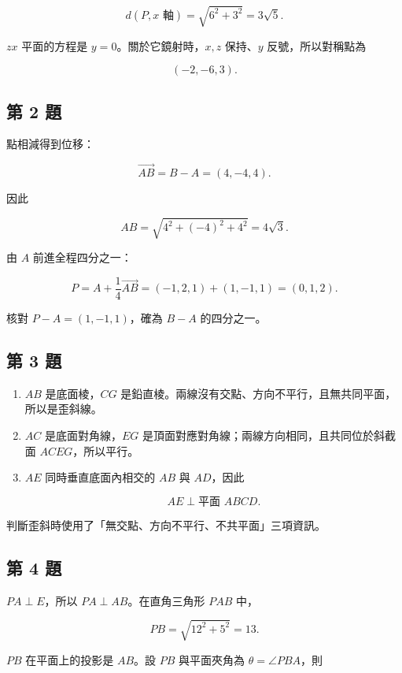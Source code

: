 \documentclass[11pt,a4paper]{article}
\begin{document}
\[
d(P,x\text{ 軸})
=\sqrt{6^2+3^2}
=3\sqrt5.
\]

\(zx\) 平面的方程是 \(y=0\)。關於它鏡射時，\(x,z\) 保持、\(y\) 反號，所以對稱點為

\[
\boxed{(-2,-6,3)}.
\]

\subsection{第 2 題}\label{ux7b2c-2-ux984c}

點相減得到位移：

\[
\overrightarrow{AB}=B-A=(4,-4,4).
\]

因此

\[
AB=\sqrt{4^2+(-4)^2+4^2}=4\sqrt3.
\]

由 \(A\) 前進全程四分之一：

\[
P=A+\frac14\overrightarrow{AB}
=(-1,2,1)+(1,-1,1)
=\boxed{(0,1,2)}.
\]

核對 \(P-A=(1,-1,1)\)，確為 \(B-A\) 的四分之一。

\subsection{第 3 題}\label{ux7b2c-3-ux984c}

\begin{enumerate}
\def\labelenumi{\arabic{enumi}.}
\item
  \(AB\) 是底面棱，\(CG\) 是鉛直棱。兩線沒有交點、方向不平行，且無共同平面，所以是歪斜線。
\item
  \(AC\) 是底面對角線，\(EG\) 是頂面對應對角線；兩線方向相同，且共同位於斜截面 \(ACEG\)，所以平行。
\item
  \(AE\) 同時垂直底面內相交的 \(AB\) 與 \(AD\)，因此

  \[
  \boxed{AE\perp\text{平面 }ABCD}.
  \]
\end{enumerate}

判斷歪斜時使用了「無交點、方向不平行、不共平面」三項資訊。

\subsection{第 4 題}\label{ux7b2c-4-ux984c}

\(PA\perp E\)，所以 \(PA\perp AB\)。在直角三角形 \(PAB\) 中，

\[
PB=\sqrt{12^2+5^2}=13.
\]

\(PB\) 在平面上的投影是 \(AB\)。設 \(PB\) 與平面夾角為 \(\theta=\angle PBA\)，則
\end{document}
